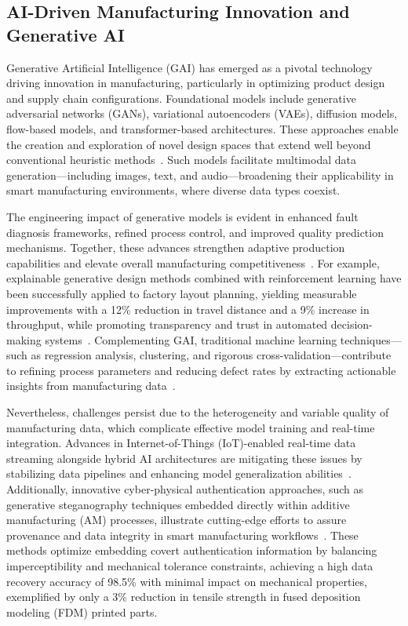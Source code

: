 \documentclass[sigconf]{acmart}
\begin{document}
\subsection{AI-Driven Manufacturing Innovation and Generative AI}

Generative Artificial Intelligence (GAI) has emerged as a pivotal technology driving innovation in manufacturing, particularly in optimizing product design and supply chain configurations. Foundational models include generative adversarial networks (GANs), variational autoencoders (VAEs), diffusion models, flow-based models, and transformer-based architectures. These approaches enable the creation and exploration of novel design spaces that extend well beyond conventional heuristic methods~\cite{ref1,ref8}. Such models facilitate multimodal data generation—including images, text, and audio—broadening their applicability in smart manufacturing environments, where diverse data types coexist.

The engineering impact of generative models is evident in enhanced fault diagnosis frameworks, refined process control, and improved quality prediction mechanisms. Together, these advances strengthen adaptive production capabilities and elevate overall manufacturing competitiveness~\cite{ref7,ref9,ref36}. For example, explainable generative design methods combined with reinforcement learning have been successfully applied to factory layout planning, yielding measurable improvements with a 12\% reduction in travel distance and a 9\% increase in throughput, while promoting transparency and trust in automated decision-making systems~\cite{ref9}. Complementing GAI, traditional machine learning techniques—such as regression analysis, clustering, and rigorous cross-validation—contribute to refining process parameters and reducing defect rates by extracting actionable insights from manufacturing data~\cite{ref10,ref13}.

Nevertheless, challenges persist due to the heterogeneity and variable quality of manufacturing data, which complicate effective model training and real-time integration. Advances in Internet-of-Things (IoT)-enabled real-time data streaming alongside hybrid AI architectures are mitigating these issues by stabilizing data pipelines and enhancing model generalization abilities~\cite{ref20,ref29}. Additionally, innovative cyber-physical authentication approaches, such as generative steganography techniques embedded directly within additive manufacturing (AM) processes, illustrate cutting-edge efforts to assure provenance and data integrity in smart manufacturing workflows~\cite{ref10}. These methods optimize embedding covert authentication information by balancing imperceptibility and mechanical tolerance constraints, achieving a high data recovery accuracy of 98.5\% with minimal impact on mechanical properties, exemplified by only a 3\% reduction in tensile strength in fused deposition modeling (FDM) printed parts.
\end{document}
